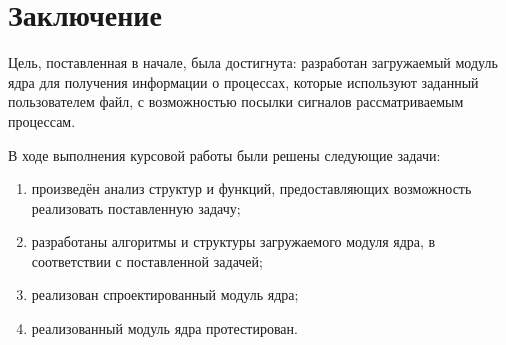\chapter*{Заключение}

Цель, поставленная в начале, была достигнута: разработан загружаемый модуль ядра для получения информации о процессах, которые используют заданный пользователем файл, с возможностью посылки сигналов рассматриваемым процессам.

В ходе выполнения курсовой работы были решены следующие задачи:
\begin{enumerate}[label=\arabic*)]
	\item произведён анализ структур и функций, предоставляющих возможность реализовать поставленную задачу;
	\item разработаны алгоритмы и структуры загружаемого модуля ядра, в соответствии с поставленной задачей;
	\item реализован спроектированный модуль ядра;
	\item реализованный модуль ядра протестирован.
\end{enumerate}